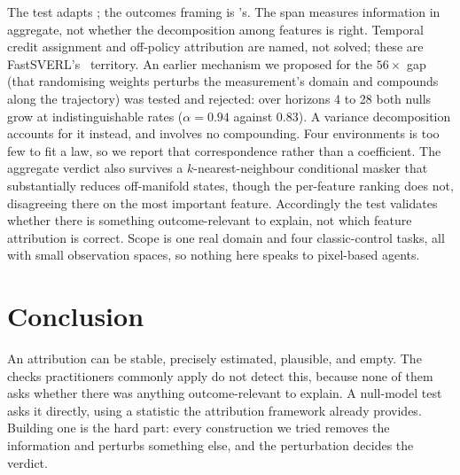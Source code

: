 \documentclass[10pt,twocolumn]{article}
\begin{document}
The test adapts \citet{adebayo2018sanity}; the outcomes framing is
\citet{beechey2023sverl}'s. The span measures information in aggregate, not
whether the decomposition among features is right. Temporal credit assignment and
off-policy attribution are named, not solved; these are
FastSVERL's~\citep{beechey2025fastsverl} territory. An earlier mechanism we
proposed for the $56\times$ gap (that randomising weights perturbs the
measurement's domain and compounds along the trajectory) was tested and
rejected: over horizons 4 to 28 both nulls grow at indistinguishable rates
($\alpha=0.94$ against $0.83$). A variance decomposition accounts for it
instead, and involves no compounding. Four environments is too few to fit
a law, so we report that correspondence rather than a coefficient. The aggregate verdict also survives a
$k$-nearest-neighbour conditional masker that substantially reduces off-manifold
states, though the per-feature ranking does not, disagreeing there on the most
important feature. Accordingly the test validates whether there is something
outcome-relevant to explain, not which feature attribution is correct. Scope is
one real domain and four classic-control tasks, all with small observation
spaces, so nothing here speaks to pixel-based agents.

\section{Conclusion}

An attribution can be stable, precisely estimated, plausible, and empty. The
checks practitioners commonly apply do not detect this, because none of them
asks whether there was anything outcome-relevant to explain. A null-model test asks it directly, using a
statistic the attribution framework already provides. Building one is the hard
part: every construction we tried removes the information and perturbs something
else, and the perturbation decides the verdict.



\end{document}
